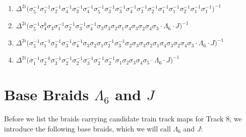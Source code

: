 \begin{enumerate}
    \item $\displaystyle \Delta^{2i} \big( \allowbreak\sigma_{5}^{-1}\allowbreak\sigma_{1}^{-1}\allowbreak\sigma_{2}^{-1}\allowbreak\sigma_{4}^{-1}\allowbreak\sigma_{3}^{-1}\allowbreak\sigma_{4}^{-1}\allowbreak\sigma_{5}^{-1}\allowbreak\sigma_{3}^{-1}\allowbreak\sigma_{3}^{-1}\allowbreak\sigma_{4}^{-1}\allowbreak\sigma_{3}^{-1}\allowbreak\sigma_{2}^{-1}\allowbreak\sigma_{1}^{-1}\allowbreak\sigma_{1}^{-1}\allowbreak\sigma_{2}^{-1}\allowbreak\sigma_{1}^{-1}\allowbreak\sigma_{1}^{-1} \big)^{-1}$
    \item $\displaystyle \Delta^{2i} \big( \allowbreak\sigma_{5}^{-1}\allowbreak\sigma_{4}^k\allowbreak\sigma_{3}\allowbreak\sigma_{1}^{-1}\allowbreak\sigma_{2}^{-1}\allowbreak\sigma_{3}^{-1}\allowbreak\sigma_{4}^{-1}\allowbreak\sigma_{3}\allowbreak\sigma_{3}\allowbreak\sigma_{2}\allowbreak\sigma_{1}\allowbreak\sigma_{4}\allowbreak\sigma_{3}\allowbreak\sigma_{2}\allowbreak\sigma_{4}\allowbreak\sigma_{3} \cdot \Lambda_6 \cdot J \big)^{-1}$
    \item $\displaystyle \Delta^{2i} \big( \allowbreak\sigma_{5}^{-1}\allowbreak\sigma_{1}^{-1}\allowbreak\sigma_{2}^{-1}\allowbreak\sigma_{3}^{-1}\allowbreak\sigma_{4}^{-1}\allowbreak\sigma_{3}\allowbreak\sigma_{2}\allowbreak\sigma_{1}\allowbreak\sigma_{2}^{-1}\allowbreak\sigma_{3}^{-1}\allowbreak\sigma_{2}\allowbreak\sigma_{3}\allowbreak\sigma_{3}\allowbreak\sigma_{2}\allowbreak\sigma_{1}\allowbreak\sigma_{4}\allowbreak\sigma_{3}\allowbreak\sigma_{2}\allowbreak\sigma_{4}\allowbreak\sigma_{3} \cdot \Lambda_6 \cdot J \big)^{-1}$
    \item $\displaystyle \Delta^{2i} \big( \allowbreak\sigma_{1}^{-1}\allowbreak\sigma_{2}^{-k}\allowbreak\sigma_{3}^{-1}\allowbreak\sigma_{2}^{-1}\allowbreak\sigma_{2}^{-1}\allowbreak\sigma_{3}^{-1}\allowbreak\sigma_{2}^{-1}\allowbreak\sigma_{2}^{-1}\allowbreak\sigma_{1}\allowbreak\sigma_{2}\allowbreak\sigma_{3}\allowbreak\sigma_{4}\allowbreak\sigma_{5} \cdot \Lambda_6 \cdot J \big)^{-1}$
\end{enumerate}
\endgroup

\clearpage

\section{Base Braids \texorpdfstring{$\Lambda_6$}{Lambda\_6} and \texorpdfstring{$J$}{J}}
Before we list the braids carrying candidate train track maps for Track 8, we introduce the following base braids, which we will call $\Lambda_6$ and $J$:

